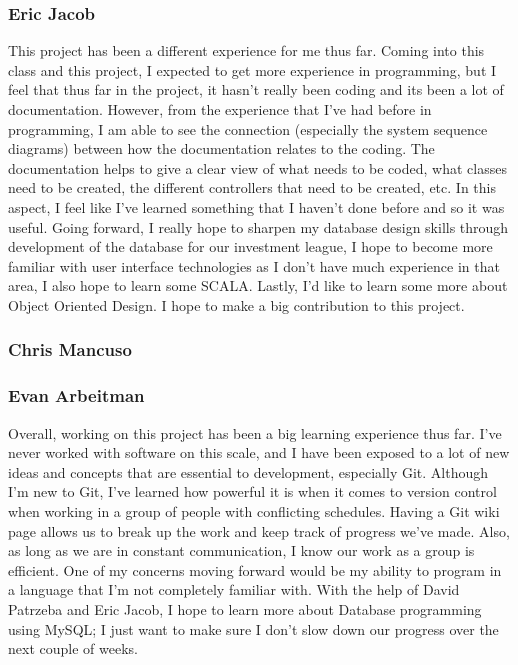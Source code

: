 \subsubsection{Eric Jacob}
This project has been a different experience for me thus far.  Coming into this
class and this project, I expected to get more experience in programming, but I
feel that thus far in the project, it hasn't really been coding and its been a
lot of documentation.  However, from the experience that I've had before in
programming, I am able to see the connection (especially the system sequence
diagrams) between how the documentation relates to the coding.  The
documentation helps to give a clear view of what needs to be coded, what classes
need to be created, the different controllers that need to be created, etc.  In
this aspect, I feel like I've learned something that I haven't done before and
so it was useful.  Going forward, I really hope to sharpen my database design
skills through development of the database for our investment league, I hope to
become more familiar with user interface technologies as I don't have much
experience in that area, I also hope to learn some SCALA.  Lastly, I'd like to
learn some more about Object Oriented Design.  I hope to make a big contribution
to this project.

\subsubsection{Chris Mancuso}

\subsubsection{Evan Arbeitman}
Overall, working on this project has been a big learning experience thus far.
I've never worked with software on this scale, and I have been exposed to a lot
of new ideas and concepts that are essential to development, especially Git.
Although I'm new to Git, I've learned how powerful it is when it comes to
version control when working in a group of people with conflicting schedules.
Having a Git wiki page allows us to break up the work and keep track of
progress we've made. Also, as long as we are in constant communication, I know
our work as a group is efficient. One of my concerns moving forward would be my
ability to program in a language that I'm not completely familiar with. With
the help of David Patrzeba and Eric Jacob, I hope to learn more about Database
programming using MySQL; I just want to make sure I don't slow down our progress
over the next couple of weeks.

